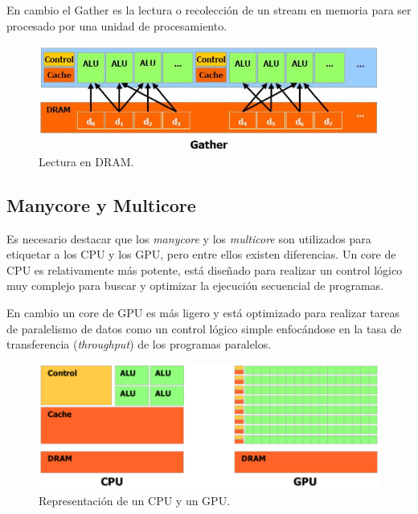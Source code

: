 \begin{itemize}
En cambio el Gather es la lectura o recolección de un stream en memoria para ser procesado por una unidad de procesamiento.

        \begin{figure}[ht]
      \centering
        \includegraphics[scale=1]{img/gather}
        \caption{Lectura en DRAM\cite{NCUDA}.}
        \label{fig:gather}
    \end{figure}

\end{itemize} 
    \subsection{Manycore y Multicore}
    Es necesario destacar que los \textit{manycore} y los \textit{multicore} son utilizados para etiquetar a los CPU y los GPU, pero entre ellos existen diferencias. Un core de CPU es relativamente más potente, está diseñado para realizar un control lógico muy complejo para buscar y optimizar la ejecución secuencial de programas.
   
    \vspace{0.3cm}
    En cambio un core de GPU es más ligero y está optimizado para realizar tareas de paralelismo de datos como un control lógico simple enfocándose en la tasa de transferencia (\textit{throughput}) de los programas paralelos.
    
        \begin{figure}[ht]
      \centering
        \includegraphics[scale=0.35]{img/repCPUGPU}
        \caption{Representación de un CPU y un GPU\cite{NCUDA}.}
        \label{fig:gpgpu}
    \end{figure}
    
